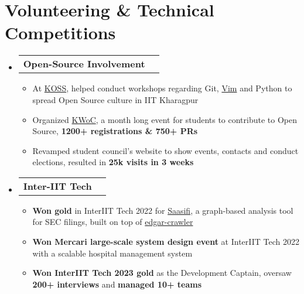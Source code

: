 \documentclass[letterpaper,11pt]{article}
\makeatletter
\newcommand{\resumeItem}[1]{
  \item\small{
    {#1 \vspace{-3pt}} %
  }
}
\newcommand{\resumeSubSubheading}[2]{
    \item %
    \begin{tabular*}{0.97\textwidth}{l@{\extracolsep{\fill}}r}
      \textbf{\small#1} & \textbf{\small #2} \\
    \end{tabular*}\vspace{-5pt} %
}
\newcommand{\resumeSubHeadingListStart}{\begin{itemize}[leftmargin=0.0in, label={}]} %
\newcommand{\resumeSubHeadingListEnd}{\end{itemize}} %
\newcommand{\resumeItemListStart}{\begin{itemize}} %
\newcommand{\resumeItemListEnd}{\end{itemize}\vspace{-9pt}} %
\makeatother
\begin{document}
\section{Volunteering \& Technical Competitions}
%
\resumeSubHeadingListStart
    \resumeSubSubheading{\textbf{Open-Source Involvement}}{}
    \resumeItemListStart
        \resumeItem{At \href{https://kossiitkgp.org/}{KOSS}, helped conduct workshops regarding Git, \href{https://www.youtube.com/watch?v=4zNbLz7ugBo}{Vim} and Python to spread Open Source culture in IIT Kharagpur}
        \resumeItem{Organized \href{https://kwoc21.kossiitkgp.org/}{KWoC}, a month long event for students to contribute to Open Source, \textbf{1200+ registrations \& 750+ PRs}} %
\resumeItem{Revamped student council's website to show events, contacts and conduct elections, resulted in \textbf{25k visits in 3 weeks}} %
    \resumeItemListEnd
%
    \resumeSubSubheading{\textbf{Inter-IIT Tech}}{}
    \resumeItemListStart
        \resumeItem{\textbf{Won gold} in InterIIT Tech 2022 for {\href{https://github.com/pinter-pi-pi-tea/documentation/blob/main/Documentation.md} {Saasifi}}, a graph-based analysis tool for SEC filings, built on top of \href{https://github.com/nlpaueb/edgar-crawler}{edgar-crawler}} %
        \resumeItem{\textbf{Won Mercari large-scale system design event} at InterIIT Tech 2022 with a scalable hospital management system} %
        \resumeItem{\textbf{Won InterIIT Tech 2023 gold} as the Development Captain, oversaw \textbf{200+ interviews} and \textbf{managed 10+ teams}} %
    \resumeItemListEnd
    \resumeSubHeadingListEnd
\end{document}

